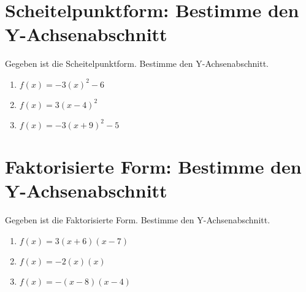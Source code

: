 \documentclass{article}%
\begin{document}
\section{Scheitelpunktform: Bestimme den Y{-}Achsenabschnitt}%
\label{sec:ScheitelpunktformBestimmedenY{-}Achsenabschnitt}%
Gegeben ist die Scheitelpunktform. Bestimme den Y{-}Achsenabschnitt.%
\begin{enumerate}[label=\alph*)]%
\item%
\newline\vspace{0.5cm} $f(x)=-3(x)^2 -6$%
\item%
\newline\vspace{0.5cm} $f(x)=3(x-4)^2$%
\item%
\newline\vspace{0.5cm} $f(x)=-3(x+9)^2 -5$%
\end{enumerate}

%
\section{Faktorisierte Form: Bestimme den Y{-}Achsenabschnitt}%
\label{sec:FaktorisierteFormBestimmedenY{-}Achsenabschnitt}%
Gegeben ist die Faktorisierte Form. Bestimme den Y{-}Achsenabschnitt.%
\begin{enumerate}[label=\alph*)]%
\item%
\newline\vspace{0.5cm} $f(x)=3(x+6)(x-7)$%
\item%
\newline\vspace{0.5cm} $f(x)=-2(x)(x)$%
\item%
\newline\vspace{0.5cm} $f(x)=-(x-8)(x-4)$%
\end{enumerate}

%
\end{document}
